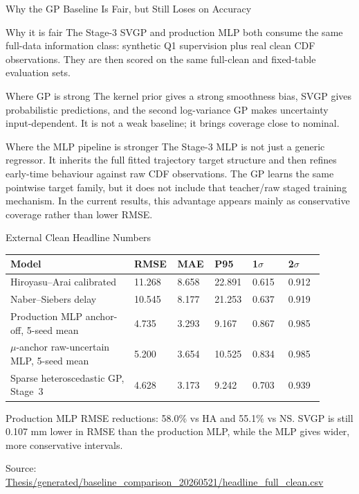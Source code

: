 \documentclass[UTF8,aspectratio=169]{ctexbeamer}
\newcommand{\good}[1]{\textcolor{green!45!black}{#1}}
\newcommand{\src}[1]{\vfill{\tiny\textcolor{gray!75!black}{Source: \url{#1}}}}
\begin{document}
\begin{frame}{Why the GP Baseline Is Fair, but Still Loses on Accuracy}
\small
\begin{block}{Why it is fair}
\footnotesize
The Stage-3 SVGP and production MLP both consume the same full-data information
class: synthetic Q1 supervision plus real clean CDF observations. They are then
scored on the same full-clean and fixed-table evaluation sets.
\end{block}

\begin{block}{Where GP is strong}
\footnotesize
The kernel prior gives a strong smoothness bias, SVGP gives probabilistic
predictions, and the second log-variance GP makes uncertainty input-dependent.
It is not a weak baseline; it brings coverage close to nominal.
\end{block}

\begin{block}{Where the MLP pipeline is stronger}
\footnotesize
The Stage-3 MLP is not just a generic regressor. It inherits the full fitted
trajectory target structure and then refines early-time behaviour against raw
CDF observations. The GP learns the same pointwise target family, but it does
not include that teacher/raw staged training mechanism. In the current results,
this advantage appears mainly as conservative coverage rather than lower RMSE.
\end{block}
\end{frame}

\begin{frame}{External Clean Headline Numbers}
\scriptsize
\begin{center}
{\setlength{\tabcolsep}{3pt}
\begin{tabular}{L{0.38\linewidth}R{0.10\linewidth}R{0.10\linewidth}R{0.10\linewidth}R{0.11\linewidth}R{0.11\linewidth}}
\toprule
Model & RMSE & MAE & P95 & 1\(\sigma\) & 2\(\sigma\) \\
\midrule
Hiroyasu--Arai calibrated & 11.268 & 8.658 & 22.891 & 0.615 & 0.912 \\
Naber--Siebers delay & 10.545 & 8.177 & 21.253 & 0.637 & 0.919 \\
\good{Production MLP anchor-off, 5-seed mean} & \good{4.735} & 3.293 & \good{9.167} & \good{0.867} & \good{0.985} \\
\good{\(\mu\)-anchor raw-uncertain MLP, 5-seed mean} & 5.200 & 3.654 & 10.525 & 0.834 & 0.985 \\
Sparse heteroscedastic GP, Stage~3 & \good{4.628} & \good{3.173} & 9.242 & 0.703 & 0.939 \\
\bottomrule
\end{tabular}
}
\end{center}

\vspace{0.35em}
\footnotesize
Production MLP RMSE reductions: 58.0\% vs HA and 55.1\% vs NS. SVGP is still
0.107 mm lower in RMSE than the production MLP, while the MLP gives wider,
more conservative intervals.

\src{Thesis/generated/baseline_comparison_20260521/headline_full_clean.csv}
\end{frame}
\end{document}
